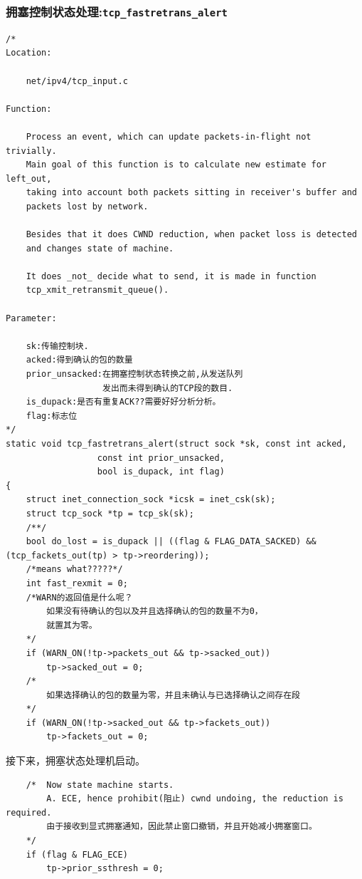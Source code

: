         \subsubsection{拥塞控制状态处理:\texttt{tcp_fastretrans_alert}}
            \label{CongestionDeal:tcp_fastretrans_alert}
\begin{verbatim}
/* 
Location:

    net/ipv4/tcp_input.c

Function:

    Process an event, which can update packets-in-flight not trivially.
    Main goal of this function is to calculate new estimate for left_out,
    taking into account both packets sitting in receiver's buffer and
    packets lost by network.
    
    Besides that it does CWND reduction, when packet loss is detected
    and changes state of machine.
    
    It does _not_ decide what to send, it is made in function
    tcp_xmit_retransmit_queue().

Parameter:

    sk:传输控制块.
    acked:得到确认的包的数量
    prior_unsacked:在拥塞控制状态转换之前,从发送队列
                   发出而未得到确认的TCP段的数目.
    is_dupack:是否有重复ACK??需要好好分析分析。
    flag:标志位
*/
static void tcp_fastretrans_alert(struct sock *sk, const int acked,
                  const int prior_unsacked,
                  bool is_dupack, int flag)
{
    struct inet_connection_sock *icsk = inet_csk(sk);
    struct tcp_sock *tp = tcp_sk(sk);
    /**/
    bool do_lost = is_dupack || ((flag & FLAG_DATA_SACKED) && (tcp_fackets_out(tp) > tp->reordering));
    /*means what?????*/ 
    int fast_rexmit = 0;
    /*WARN的返回值是什么呢？
        如果没有待确认的包以及并且选择确认的包的数量不为0，
        就置其为零。
    */
    if (WARN_ON(!tp->packets_out && tp->sacked_out))
        tp->sacked_out = 0;
    /*
        如果选择确认的包的数量为零，并且未确认与已选择确认之间存在段
    */
    if (WARN_ON(!tp->sacked_out && tp->fackets_out))
        tp->fackets_out = 0;
\end{verbatim}

        接下来，拥塞状态处理机启动。
\begin{verbatim}
    /*  Now state machine starts.
        A. ECE, hence prohibit(阻止) cwnd undoing, the reduction is required. 
        由于接收到显式拥塞通知，因此禁止窗口撤销，并且开始减小拥塞窗口。
    */
    if (flag & FLAG_ECE)
        tp->prior_ssthresh = 0;
\end{verbatim}

